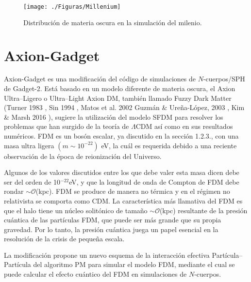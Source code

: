 \documentclass[a4paper,openright,10pt, oneside, final]{book}
\begin{document}
\begin{figure}
\centering
      \texttt{[image: ./Figuras/Millenium]}{\caption{\footnotesize{Distribución de materia oscura en la simulación del milenio.}}}\label{fig 3.2}%
\end{figure}

\section{Axion-Gadget}
Axion-Gadget \cite{3.1} es una modificación del código de simulaciones de $N$-cuerpos/SPH de Gadget-2. Está basado en un modelo diferente de materia oscura, el Axion Ultra--Ligero o Ultra--Light Axion DM, también llamado Fuzzy Dark Matter (Turner 1983 \cite{3.1.1}, Sin 1994 \cite{3.1.2}, Matos et al. 2002 \cite{3.1.3} Guzmán \& Ureña-López, 2003 \cite{3.1.4}, Kim \& Marsh 2016 \cite{3.1.5}), sugiere la utilización del modelo SFDM para resolver los problemas que han surgido de la teoría de $\Lambda$CDM así como en sus resultados numéricos. FDM es un bosón escalar, ya discutido en la sección 1.2.3., con una masa ultra ligera $(m \sim 10^{-22})$ eV, la cuál es requerida debido a una reciente observación de la época de reionización del Universo. 

Algunos de los valores discutidos entre los que debe valer esta masa dicen debe ser del orden de 10$^{-22}$eV, y que la longitud de onda de Compton de FDM debe rondar $\sim \mathcal{O}$(kpc). FDM se produce de manera no térmica y en el régimen no relativista se comporta como CDM. La característica más llamativa del FDM es que el halo tiene un núcleo solitónico de tamaño $\sim \mathcal{O} $(kpc) resultante de la presión cuántica de las partículas FDM, que puede ser más grande que su propia gravedad. Por lo tanto, la presión cuántica juega un papel esencial en la resolución de la crisis de pequeña escala. 

La modificación propone un nuevo esquema de la interacción efectiva Partícula--Partícula del algoritmo PM para simular el modelo FDM, mediante el cual se puede calcular el efecto cuántico del FDM en simulaciones de $N$-cuerpos.
\end{document}

